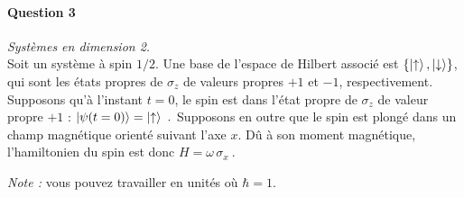 \paragraph{Question 3} \textit{Systèmes en dimension 2.} \\

Soit un système à spin $1/2$. Une base de l'espace de Hilbert associé est $\lbrace\ket{\uparrow}, \ket{\downarrow}\rbrace$, qui sont les états propres de $\sigma_z$ de valeurs propres $+1$ et $-1$, respectivement. \\

Supposons qu'à l'instant $t=0$, le spin est dans l'état propre de $\sigma_z$ de valeur propre $+1$ : $\ket{\psi(t=0)} = \ket{\uparrow} \ .$ Supposons en outre que le spin est plongé dans un champ magnétique orienté suivant l'axe $x$. Dû à son moment magnétique, l'hamiltonien du spin est donc $H=\omega \, \sigma_x\ .$

\textit{Note :} vous pouvez travailler en unités où $\hbar =1$. \\

